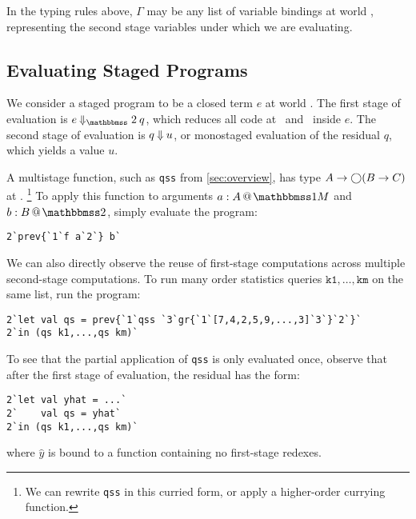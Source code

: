 In the typing rules above, $\Gamma$ may be any list of variable bindings at world \bbtwo,
representing the second stage variables under which we are evaluating.

\subsection{Evaluating Staged Programs}

We consider a staged program to be a closed term $e$ at world \bbtwo. The first
stage of evaluation is $e\mathbin{\redtwosym} q$, which reduces all code at
\bbonem\ and \bbonep\ inside $e$. The second stage of evaluation is $q
\mathbin{{\Downarrow}} u$, or monostaged evaluation of the residual $q$, which yields
a value $u$.

A multistage function, such as \texttt{qss} from \ref{sec:overview}, has
type $A\to \bigcirc (B \to C)$ at \bbonem.%
\footnote{We can rewrite \texttt{qss} in this curried form, or apply a
higher-order currying function.}
To apply this function to arguments $\colmix a A$ and $\coltwo b B$, simply
evaluate the program:
\begin{lstlisting}
2`prev{`1`f a`2`} b`
\end{lstlisting}

We can also directly observe the reuse of first-stage computations across
multiple second-stage computations. To run many order statistics queries
$\texttt{k1},\dots,\texttt{km}$ on the same list, run the program:
\begin{lstlisting}
2`let val qs = prev{`1`qss `3`gr{`1`[7,4,2,5,9,...,3]`3`}`2`}`
2`in (qs k1,...,qs km)`
\end{lstlisting}
To see that the partial application of \texttt{qss} is only evaluated once,
observe that after the first stage of evaluation, the residual has the form:
\begin{lstlisting}
2`let val yhat = ...`
2`    val qs = yhat`
2`in (qs k1,...,qs km)`
\end{lstlisting}
where $\hat{y}$ is bound to a function containing no first-stage redexes.
